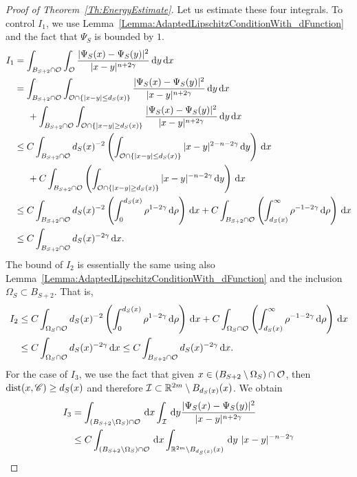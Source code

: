 \begin{proof}[Proof of Theorem~\ref{Th:EnergyEstimate}]
Let us estimate these four integrals. To control $I_1$, we use Lemma~\ref{Lemma:AdaptedLipschitzConditionWith_dFunction} and the fact that $\Psi_S$ is bounded by $1$.
\begin{align*}
I_1 &= \int_{B_{S+2} \cap \mathcal{O}} \int_{\mathcal{O}} \frac{|\Psi_S(x)-\Psi_S(y)|^2}{|x-y|^{n+2\gamma}} \,\mathrm{d} y\,\mathrm{d} x\\
&= \int_{B_{S+2} \cap \mathcal{O}} \int_{\mathcal{O}\cap\{|x-y|\leq d_S(x)\}} \frac{|\Psi_S(x)-\Psi_S(y)|^2}{|x-y|^{n+2\gamma}} \,\mathrm{d} y\,\mathrm{d} x\\
&\hspace{5mm} + \int_{B_{S+2} \cap \mathcal{O}} \int_{\mathcal{O}\cap\{|x-y|\geq d_S(x)\}} \frac{|\Psi_S(x)-\Psi_S(y)|^2}{|x-y|^{n+2\gamma}} \,\mathrm{d} y\,\mathrm{d} x\\
&\leq C \int_{B_{S+2} \cap \mathcal{O}} d_S(x)^{-2}\left(\int_{\mathcal{O}\cap\{|x-y|\leq d_S(x)\}} |x-y|^{2-n-2\gamma} \,\mathrm{d} y\right)\,\mathrm{d} x\\
&\hspace{5mm} + C \int_{B_{S+2} \cap \mathcal{O}} \left(\int_{\mathcal{O}\cap\{|x-y|\geq d_S(x)\}} |x-y|^{-n-2\gamma} \,\mathrm{d} y \right)\,\mathrm{d} x\\
&\leq C \int_{B_{S+2} \cap \mathcal{O}} d_S(x)^{-2}\left(\int_0^{d_S(x)} \rho^{1-2\gamma} \,\mathrm{d} \rho\right)\,\mathrm{d} x + C \int_{B_{S+2} \cap \mathcal{O}}  \left(\int_{d_S(x)}^\infty \rho^{-1-2\gamma} \,\mathrm{d}\rho\right) \,\mathrm{d} x\\
&\leq C \int_{B_{S+2} \cap \mathcal{O}} d_S(x)^{-2\gamma} \,\mathrm{d} x.
\end{align*}
The bound of $I_2$ is essentially the same using also Lemma~\ref{Lemma:AdaptedLipschitzConditionWith_dFunction} and the inclusion $\Omega_S \subset B_{S+2}$. That is,
\begin{align*}
I_2 &\leq C \int_{\Omega_S \cap \mathcal{O}} d_S(x)^{-2}\left(\int_0^{d_S(x)} \rho^{1-2\gamma} \,\mathrm{d} \rho\right)\,\mathrm{d} x + C \int_{\Omega_S \cap \mathcal{O}} \left( \int_{d_S(x)}^\infty \rho^{-1-2\gamma} \,\mathrm{d}\rho \right) \,\mathrm{d} x\\
&\leq C \int_{\Omega _S\cap \mathcal{O}} d_S(x)^{-2\gamma} \,\mathrm{d} x \leq C \int_{B_{S+2} \cap \mathcal{O}} d_S(x)^{-2\gamma} \,\mathrm{d} x.
\end{align*}
For the case of $I_3$, we use the fact that given $x\in (B_{S+2}\setminus \Omega_S)\cap \mathcal{O}$, then $\operatorname{dist}(x,\mathscr{C})\geq d_S(x)$ and therefore $\mathcal{I} \subset \mathbb{R}^{2m}\setminus B_{d_S(x)}(x)$. We obtain
\begin{align*}
I_3 &= \int_{(B_{S+2}\setminus \Omega_S) \cap \ocal} \d x \int_{\ical} \d y \frac{|\Psi_S(x)-\Psi_S(y)|^2}{|x-y|^{n+2\s}} \\
&\leq C \int_{(B_{S+2}\setminus \Omega_S) \cap \ocal} \d x \int_{\R^{2m}\setminus B_{d_S(x)}(x)} \d y \ |x-y|^{-n-2\s} \\

\end{align*}
\end{proof}
